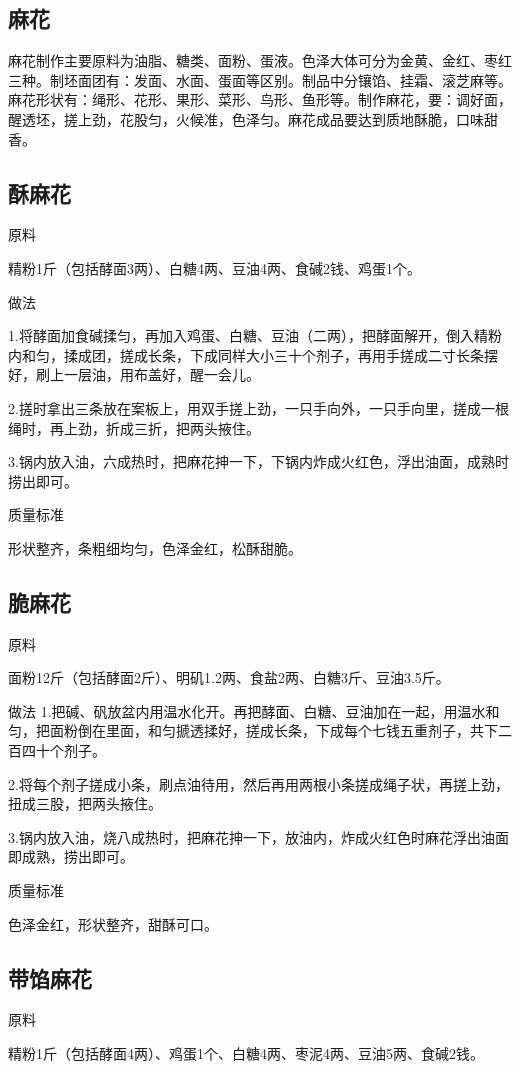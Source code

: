 \documentclass{ctexbook}
\begin{document}
\subsection{麻花}
麻花制作主要原料为油脂、糖类、面粉、蛋液。色泽大体可分为金黄、金红、枣红三种。制坯面团有：发面、水面、蛋面等区别。制品中分镶馅、挂霜、滚芝麻等。麻花形状有：绳形、花形、果形、菜形、鸟形、鱼形等。制作麻花，要：调好面，醒透坯，搓上劲，花股匀，火候准，色泽匀。麻花成品要达到质地酥脆，口味甜香。
\subsection{酥麻花}
原料

精粉1斤（包括酵面3两）、白糖4两、豆油4两、食碱2钱、鸡蛋1个。

做法

1.将酵面加食碱揉匀，再加入鸡蛋、白糖、豆油（二两），把酵面解开，倒入精粉内和匀，揉成团，搓成长条，下成同样大小三十个剂子，再用手搓成二寸长条摆好，刷上一层油，用布盖好，醒一会儿。

2.搓时拿出三条放在案板上，用双手搓上劲，一只手向外，一只手向里，搓成一根绳时，再上劲，折成三折，把两头掖住。

3.锅内放入油，六成热时，把麻花抻一下，下锅内炸成火红色，浮出油面，成熟时捞出即可。

质量标准

形状整齐，条粗细均匀，色泽金红，松酥甜脆。
\subsection{脆麻花}
原料

面粉12斤（包括酵面2斤）、明矶1.2两、食盐2两、白糖3斤、豆油3.5斤。

做法
1.把碱、矾放盆内用温水化开。再把酵面、白糖、豆油加在一起，用温水和匀，把面粉倒在里面，和匀搋透揉好，搓成长条，下成每个七钱五重剂子，共下二百四十个剂子。

2.将每个剂子搓成小条，刷点油待用，然后再用两根小条搓成绳子状，再搓上劲，扭成三股，把两头掖住。

3.锅内放入油，烧八成热时，把麻花抻一下，放油内，炸成火红色时麻花浮出油面即成熟，捞出即可。

质量标准

色泽金红，形状整齐，甜酥可口。
\subsection{带馅麻花}
原料

精粉1斤（包括酵面4两）、鸡蛋1个、白糖4两、枣泥4两、豆油5两、食碱2钱。
\end{document}
